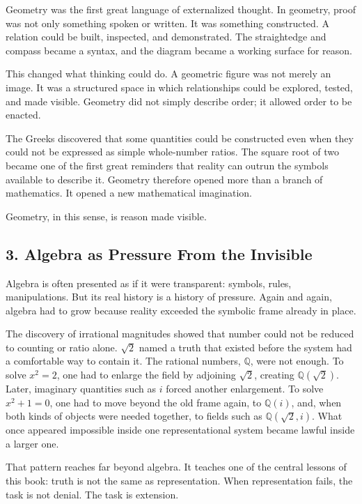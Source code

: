 Geometry was the first great language of externalized thought. In
geometry, proof was not only something spoken or written. It was
something constructed. A relation could be built, inspected, and
demonstrated. The straightedge and compass became a syntax, and the
diagram became a working surface for reason.

This changed what thinking could do. A geometric figure was not merely
an image. It was a structured space in which relationships could be
explored, tested, and made visible. Geometry did not simply describe
order; it allowed order to be enacted.

The Greeks discovered that some quantities could be constructed even
when they could not be expressed as simple whole-number ratios. The
square root of two became one of the first great reminders that reality
can outrun the symbols available to describe it. Geometry therefore
opened more than a branch of mathematics. It opened a new mathematical
imagination.

Geometry, in this sense, is reason made visible.

\hypertarget{algebra-as-pressure-from-the-invisible}{%
\subsection{3. Algebra as Pressure From the
Invisible}\label{algebra-as-pressure-from-the-invisible}}

Algebra is often presented as if it were transparent: symbols, rules,
manipulations. But its real history is a history of pressure. Again and
again, algebra had to grow because reality exceeded the symbolic frame
already in place.

The discovery of irrational magnitudes showed that number could not be
reduced to counting or ratio alone. \(\sqrt{2}\) named a truth that
existed before the system had a comfortable way to contain it. The
rational numbers, \(\mathbb{Q}\), were not enough. To solve \(x^2 = 2\),
one had to enlarge the field by adjoining \(\sqrt{2}\), creating
\(\mathbb{Q}(\sqrt{2})\). Later, imaginary quantities such as \(i\)
forced another enlargement. To solve \(x^2 + 1 = 0\), one had to move
beyond the old frame again, to \(\mathbb{Q}(i)\), and, when both kinds
of objects were needed together, to fields such as
\(\mathbb{Q}(\sqrt{2}, i)\). What once appeared impossible inside one
representational system became lawful inside a larger one.

That pattern reaches far beyond algebra. It teaches one of the central
lessons of this book: truth is not the same as representation. When
representation fails, the task is not denial. The task is extension.

